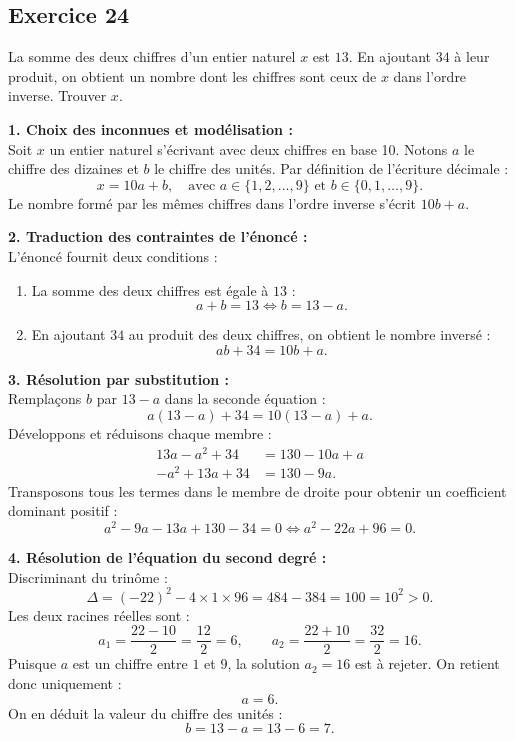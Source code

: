 \documentclass[11pt,a4paper]{article}
\begin{document}
\subsection*{Exercice 24}
La somme des deux chiffres d'un entier naturel $x$ est $13$. En ajoutant $34$ à leur produit, on obtient un nombre dont les chiffres sont ceux de $x$ dans l'ordre inverse. Trouver $x$.

\begin{correctionbox}
\textbf{1. Choix des inconnues et modélisation :}\\
Soit $x$ un entier naturel s'écrivant avec deux chiffres en base 10.
Notons $a$ le chiffre des dizaines et $b$ le chiffre des unités.
Par définition de l'écriture décimale :
\[
x = 10a + b, \quad \text{avec } a \in \{1, 2, \dots, 9\} \text{ et } b \in \{0, 1, \dots, 9\}.
\]
Le nombre formé par les mêmes chiffres dans l'ordre inverse s'écrit $10b + a$.

\textbf{2. Traduction des contraintes de l'énoncé :}\\
L'énoncé fournit deux conditions :
\begin{enumerate}
    \item La somme des deux chiffres est égale à $13$ :
    \[
    a + b = 13 \iff b = 13 - a.
    \]
    \item En ajoutant $34$ au produit des deux chiffres, on obtient le nombre inversé :
    \[
    ab + 34 = 10b + a.
    \]
\end{enumerate}

\textbf{3. Résolution par substitution :}\\
Remplaçons $b$ par $13 - a$ dans la seconde équation :
\[
a(13 - a) + 34 = 10(13 - a) + a.
\]
Développons et réduisons chaque membre :
\[
\begin{aligned}
13a - a^2 + 34 &= 130 - 10a + a \\
-a^2 + 13a + 34 &= 130 - 9a.
\end{aligned}
\]
Transposons tous les termes dans le membre de droite pour obtenir un coefficient dominant positif :
\[
a^2 - 9a - 13a + 130 - 34 = 0 \iff a^2 - 22a + 96 = 0.
\]

\textbf{4. Résolution de l'équation du second degré :}\\
Discriminant du trinôme :
\[
\Delta = (-22)^2 - 4 \times 1 \times 96 = 484 - 384 = 100 = 10^2 > 0.
\]
Les deux racines réelles sont :
\[
a_1 = \frac{22 - 10}{2} = \frac{12}{2} = 6, \qquad a_2 = \frac{22 + 10}{2} = \frac{32}{2} = 16.
\]
Puisque $a$ est un chiffre entre $1$ et $9$, la solution $a_2 = 16$ est à rejeter. On retient donc uniquement :
\[
a = 6.
\]
On en déduit la valeur du chiffre des unités :
\[
b = 13 - a = 13 - 6 = 7.
\]


\end{correctionbox}
\end{document}

